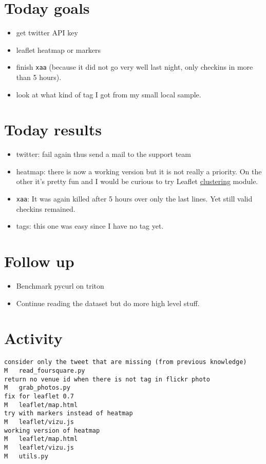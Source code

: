 \section*{Today goals}
\begin{itemize}
	\item get twitter API key
	\item leaflet heatmap or markers
	\item finish \texttt{xaa} (because it did not go very well last night,
		only  checkins in more than 5 hours).
	\item look at what kind of tag I got from my small local sample.
\end{itemize}

\section*{Today results}
\begin{itemize}
	\item twitter: fail again thus send a mail to the support team
	\item heatmap: there is now a working version but it is not really a
		priority. On the other it's pretty fun and I would be curious to try
		Leaflet
		\href{https://github.com/Leaflet/Leaflet.markercluster}{clustering}
		module.
	\item \texttt{xaa}: It was again killed after 5 hours over only the last
		 lines. Yet still  valid checkins
		remained.
	\item tags: this one was easy since I have no tag yet.
\end{itemize}

\section*{Follow up}
\begin{itemize}
	\item Benchmark pycurl on triton
	\item Continue reading the dataset but do more high level stuff.
\end{itemize}

\section*{Activity}
\begin{verbatim}
consider only the tweet that are missing (from previous knowledge)
M	read_foursquare.py
return no venue id when there is not tag in flickr photo
M	grab_photos.py
fix for leaflet 0.7
M	leaflet/map.html
try with markers instead of heatmap
M	leaflet/vizu.js
working version of heatmap
M	leaflet/map.html
M	leaflet/vizu.js
M	utils.py
\end{verbatim}